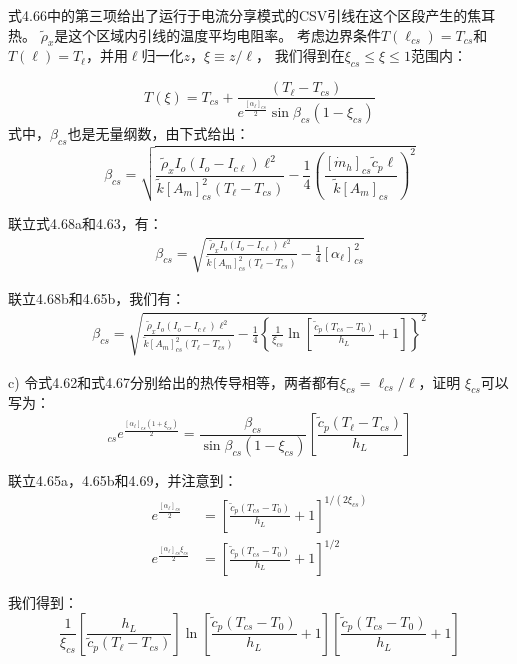 式4.66中的第三项给出了运行于电流分享模式的CSV引线在这个区段产生的焦耳热。
$\tilde{\rho}_x$是这个区域内引线的温度平均电阻率。
考虑边界条件$T(\ell_{cs})=T_{cs}$和$T(\ell)=T_\ell$，并用$\ell$归一化$z$，$\xi\equiv z/\ell$，
我们得到在$\xi_{cs}\le\xi\le 1$范围内：

\begin{equation}%
T(\xi)=T_{cs}+\frac{(T_\ell-T_{cs})}{e^{\frac{[\alpha_\ell]_{cs}}{2}}\sin\beta_{cs}(1-\xi_{cs})}
\end{equation}
式中，$\beta_{cs}$也是无量纲数，由下式给出：
\begin{equation}%
\beta_{cs}=\sqrt{\frac{\tilde{\rho}_xI_o(I_o-I_{c\ell})\ell^2}{\tilde{k}[A_m]_{cs}^{2}(T_\ell-T_{cs})}-\frac{1}{4}(\frac{[\dot{m}_h]_{cs}\tilde{c}_p\ell}{\tilde{k}[A_m]_{cs}})^2}
\end{equation}

联立式4.68a和4.63，有：
\begin{align*}%
\beta_{cs}=\sqrt{\frac{\tilde{\rho}_xI_o(I_o-I_{c\ell})\ell^2}{\tilde{k}[A_m]_{cs}^{2}(T_\ell-T_{cs})}-\frac{1}{4}[\alpha_\ell]_{cs}^{2}} \tag{4.68b}
\end{align*}

联立4.68b和4.65b，我们有：
\begin{align*}%
\beta_{cs}=\sqrt{\frac{\tilde{\rho}_xI_o(I_o-I_{c\ell})\ell^2}{\tilde{k}[A_m]_{cs}^{2}(T_\ell-T_{cs})}-\frac{1}{4}\left\{\frac{1}{\xi_{cs}}\ln\left[\frac{\tilde{c}_p(T_{cs}-T_0)}{h_L}+1\right]\right\}^2} \tag{4.68c}
\end{align*} 

c) 令式4.62和式4.67分别给出的热传导相等，两者都有$\xi_{cs}=\ell_{cs}/\ell$，证明
$\xi_{cs}$可以写为：
\begin{equation}%
[\alpha_\ell]_{cs}e^{\frac{[\alpha_\ell]_{cs}(1+\xi_{cs})}{2}}=\frac{\beta_{cs}}{\sin\beta_{cs}(1-\xi_{cs})}\left[\frac{\tilde{c}_p(T_\ell-T_{cs})}{h_L}\right]
\end{equation}

联立4.65a，4.65b和4.69，并注意到：
\begin{subequations}
	\begin{align*}
e^{\frac{[\alpha_\ell]_{cs}}{2}}&=\left[\frac{\tilde{c}_p(T_{cs}-T_0)}{h_L}+1\right]^{1/(2\xi_{cs})}\\
e^{\frac{[\alpha_\ell]_{cs}\xi_{cs}}{2}}&=\left[\frac{\tilde{c}_p(T_{cs}-T_0)}{h_L}+1\right]^{1/2}
	\end{align*}
\end{subequations}

我们得到：
\begin{equation}%
\frac{1}{\xi_{cs}}\left[\frac{h_L}{\tilde{c}_p(T_\ell-T_{cs})}\right]\ln\left[\frac{\tilde{c}_p(T_{cs}-T_0)}{h_L}+1\right]\left[\frac{\tilde{c}_p(T_{cs}-T_0)}{h_L}+1\right]
\end{equation}

